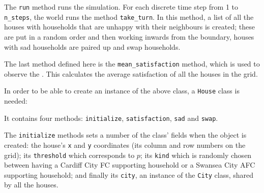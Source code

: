 The \texttt{run} method runs the simulation. For each discrete time
step from 1 to \texttt{n_steps}, the world runs the method
\texttt{take_turn}.
In this method, a list of all the houses with households that
are unhappy with their neighbours is created;
these are put in a random order and then working inwards from the boundary,
houses with sad households are paired up and swap households.

The last method defined here is the \texttt{mean_satisfaction}
method, which is used to observe the .
This calculates the average satisfaction of all the houses in the grid.

In order to be able to create an instance of the above class,
a \texttt{House} class is needed:


It contains four methods: \texttt{initialize},
\texttt{satisfaction}, \texttt{sad} and \texttt{swap}.

The \texttt{initialize} methods sets a number of the class' fields when
the object is created: the house's \texttt{x} and \texttt{y}
coordinates (its column and row numbers on the grid); its
\texttt{threshold} which corresponds to \(p\); its \texttt{kind}
which is randomly chosen between having a Cardiff City
FC supporting household or a Swansea City AFC supporting household; and finally
its \texttt{city}, an instance of the \texttt{City} class, shared
by all the houses.

